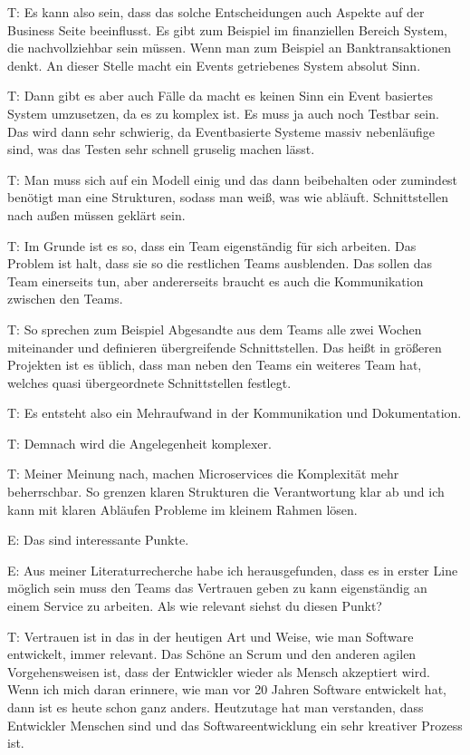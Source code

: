  \label{appendix:t-21}
T: Es kann also sein, dass das solche Entscheidungen auch Aspekte auf der Business Seite beeinflusst. Es gibt zum Beispiel im finanziellen Bereich System, die nachvollziehbar sein müssen. Wenn man zum Beispiel an Banktransaktionen denkt. An dieser Stelle macht ein Events getriebenes System absolut Sinn.

T: Dann gibt es aber auch Fälle da macht es keinen Sinn ein Event basiertes System umzusetzen, da es zu komplex ist. Es muss ja auch noch Testbar sein. Das wird dann sehr schwierig, da Eventbasierte Systeme massiv nebenläufige sind, was das Testen sehr schnell gruselig machen lässt.

 \label{appendix:t-22}
T: Man muss sich auf ein Modell einig und das dann beibehalten oder zumindest benötigt man eine Strukturen, sodass man weiß, was wie abläuft. Schnittstellen nach außen müssen geklärt sein.

 \label{appendix:t-23}
T: Im Grunde ist es so, dass ein Team eigenständig für sich arbeiten. Das Problem ist halt, dass sie so die restlichen Teams ausblenden. Das sollen das Team einerseits tun, aber andererseits braucht es auch die Kommunikation zwischen den Teams.

 \label{appendix:t-24}
T: So sprechen zum Beispiel Abgesandte aus dem Teams alle zwei Wochen miteinander und definieren übergreifende Schnittstellen. Das heißt in größeren Projekten ist es üblich, dass man neben den Teams ein weiteres Team hat, welches quasi übergeordnete Schnittstellen festlegt.

 \label{appendix:t-25}
T: Es entsteht also ein Mehraufwand in der Kommunikation und Dokumentation.

\label{appendix:t-26}
T: Demnach wird die Angelegenheit komplexer.

 \label{appendix:t-27}
T: Meiner Meinung nach, machen Microservices die Komplexität mehr beherrschbar. So grenzen klaren Strukturen die Verantwortung klar ab und ich kann mit klaren Abläufen Probleme im kleinem Rahmen lösen.

E: Das sind interessante Punkte.

E: Aus meiner Literaturrecherche habe ich herausgefunden, dass es in erster Line möglich sein muss den Teams das Vertrauen geben zu kann eigenständig an einem Service zu arbeiten. Als wie relevant siehst du diesen Punkt?

 \label{appendix:t-28}
T: Vertrauen ist in das in der heutigen Art und Weise, wie man Software entwickelt, immer relevant. Das Schöne an Scrum und den anderen agilen Vorgehensweisen ist, dass der Entwickler wieder als Mensch akzeptiert wird. Wenn ich mich daran erinnere, wie man vor 20 Jahren Software entwickelt hat, dann ist es heute schon ganz anders. Heutzutage hat man verstanden, dass Entwickler Menschen sind und das Softwareentwicklung ein sehr kreativer Prozess ist.

